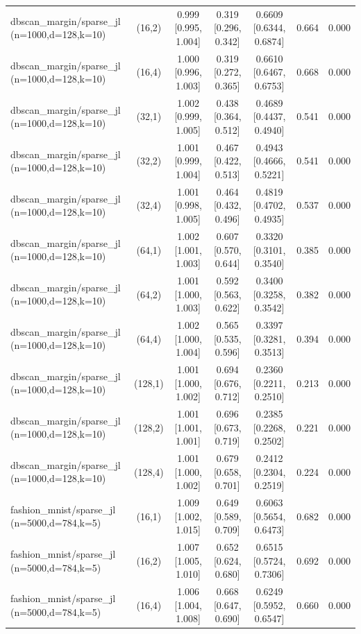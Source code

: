 \begin{tabular}{lcccccc}
dbscan\_margin/sparse\_jl (n=1000,d=128,k=10) & (16,2) & 0.999 [0.995, 1.004] & 0.319 [0.296, 0.342] & 0.6609 [0.6344, 0.6874] & 0.664 & 0.000 \\
dbscan\_margin/sparse\_jl (n=1000,d=128,k=10) & (16,4) & 1.000 [0.996, 1.003] & 0.319 [0.272, 0.365] & 0.6610 [0.6467, 0.6753] & 0.668 & 0.000 \\
dbscan\_margin/sparse\_jl (n=1000,d=128,k=10) & (32,1) & 1.002 [0.999, 1.005] & 0.438 [0.364, 0.512] & 0.4689 [0.4437, 0.4940] & 0.541 & 0.000 \\
dbscan\_margin/sparse\_jl (n=1000,d=128,k=10) & (32,2) & 1.001 [0.999, 1.004] & 0.467 [0.422, 0.513] & 0.4943 [0.4666, 0.5221] & 0.541 & 0.000 \\
dbscan\_margin/sparse\_jl (n=1000,d=128,k=10) & (32,4) & 1.001 [0.998, 1.005] & 0.464 [0.432, 0.496] & 0.4819 [0.4702, 0.4935] & 0.537 & 0.000 \\
dbscan\_margin/sparse\_jl (n=1000,d=128,k=10) & (64,1) & 1.002 [1.001, 1.003] & 0.607 [0.570, 0.644] & 0.3320 [0.3101, 0.3540] & 0.385 & 0.000 \\
dbscan\_margin/sparse\_jl (n=1000,d=128,k=10) & (64,2) & 1.001 [1.000, 1.003] & 0.592 [0.563, 0.622] & 0.3400 [0.3258, 0.3542] & 0.382 & 0.000 \\
dbscan\_margin/sparse\_jl (n=1000,d=128,k=10) & (64,4) & 1.002 [1.000, 1.004] & 0.565 [0.535, 0.596] & 0.3397 [0.3281, 0.3513] & 0.394 & 0.000 \\
dbscan\_margin/sparse\_jl (n=1000,d=128,k=10) & (128,1) & 1.001 [1.000, 1.002] & 0.694 [0.676, 0.712] & 0.2360 [0.2211, 0.2510] & 0.213 & 0.000 \\
dbscan\_margin/sparse\_jl (n=1000,d=128,k=10) & (128,2) & 1.001 [1.001, 1.001] & 0.696 [0.673, 0.719] & 0.2385 [0.2268, 0.2502] & 0.221 & 0.000 \\
dbscan\_margin/sparse\_jl (n=1000,d=128,k=10) & (128,4) & 1.001 [1.000, 1.002] & 0.679 [0.658, 0.701] & 0.2412 [0.2304, 0.2519] & 0.224 & 0.000 \\
fashion\_mnist/sparse\_jl (n=5000,d=784,k=5) & (16,1) & 1.009 [1.002, 1.015] & 0.649 [0.589, 0.709] & 0.6063 [0.5654, 0.6473] & 0.682 & 0.000 \\
fashion\_mnist/sparse\_jl (n=5000,d=784,k=5) & (16,2) & 1.007 [1.005, 1.010] & 0.652 [0.624, 0.680] & 0.6515 [0.5724, 0.7306] & 0.692 & 0.000 \\
fashion\_mnist/sparse\_jl (n=5000,d=784,k=5) & (16,4) & 1.006 [1.004, 1.008] & 0.668 [0.647, 0.690] & 0.6249 [0.5952, 0.6547] & 0.660 & 0.000 \\

\end{tabular}
